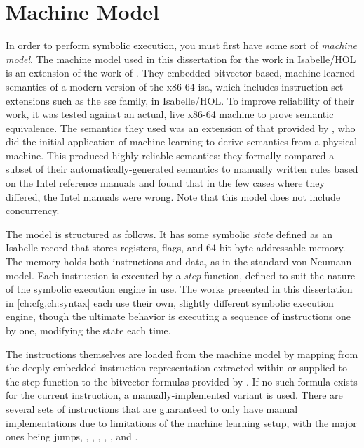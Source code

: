 \section{Machine Model}\label{se:machine_model}
In order to perform symbolic execution,
you must first have some sort of \emph{machine model}.%
The machine model used in this dissertation for the work in Isabelle/HOL
is an extension of the work of \citet{roessle2019}.
They embedded bitvector-based, machine-learned semantics
of a modern version of the x86-64 \ac{isa},
which includes instruction set extensions such as the \ac{sse} family, in Isabelle/HOL.
To improve reliability of their work,
it was tested against an actual, live x86-64 machine to prove semantic equivalence.
The semantics they used was an extension of that provided by \citet{heule2016stratified},
who did the initial application of machine learning
to derive semantics from a physical machine.
This produced highly reliable semantics:
they formally compared a subset of their automatically-generated semantics
to manually written rules based on the Intel reference manuals
and found that in the few cases where they differed, the Intel manuals were wrong.
Note that this model does not include concurrency.

The model is structured as follows.
It has some symbolic \emph{state} defined as an Isabelle record
that stores registers, flags, and 64-bit byte-addressable memory.
The memory holds both instructions and data, as in the standard von Neumann model.%
Each instruction is executed by a \emph{step} function,%
defined to suit the nature of the symbolic execution engine in use.
The works presented in this dissertation in \cref{ch:cfg,ch:syntax}
each use their own, slightly different symbolic execution engine,
though the ultimate behavior is executing a sequence of instructions one by one,
modifying the state each time.

The instructions themselves are loaded from the machine model
by mapping from the deeply-embedded instruction representation
extracted within or supplied to the step function
to the bitvector formulas provided by \citet{roessle2019}.
If no such formula exists for the current instruction,
a manually-implemented variant is used.
There are several sets of instructions
that are guaranteed to only have manual implementations due to limitations
of the machine learning setup, with the major ones being
jumps, , , , ,
, and .

